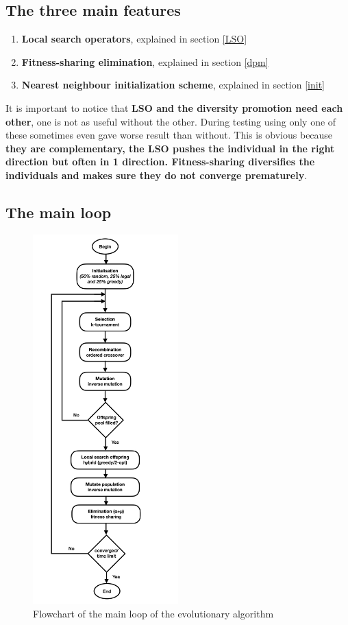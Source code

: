 \documentclass[a4paper,10pt]{article}
\begin{document}
\subsection{The three main features}
\begin{enumerate}
 \item \textbf{Local search operators}, explained in section \ref{LSO} 
 \item \textbf{Fitness-sharing elimination}, explained in section \ref{dpm} 
 \item \textbf{Nearest neighbour initialization scheme}, explained in section \ref{init} 
\end{enumerate}
It is important to notice that \textbf{LSO and the diversity promotion need each other}, one is not as useful without the other. During testing using only one of these sometimes even gave worse result than without. This is obvious because \textbf{they are complementary, the LSO pushes the individual in the right direction but often in 1 direction. Fitness-sharing diversifies the individuals and makes sure they do not converge prematurely}.

\subsection{The main loop}
\begin{figure}[h]
\caption{Flowchart of the main loop of the evolutionary algorithm}
\centering
\includegraphics[width=0.5\textwidth]{flowchart.png}
\end{figure}
\end{document}

